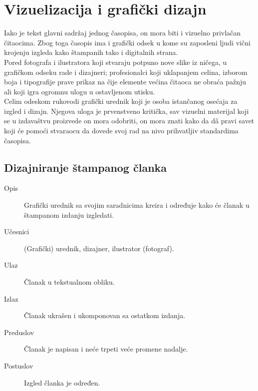 \section{Vizuelizacija i grafički dizajn}
Iako je tekst glavni sadržaj jednog časopisa, on mora biti i vizuelno privlačan čitaocima. Zbog toga časopis ima i grafički odsek u kome su zaposleni ljudi vični krojenju izgleda kako štampanih tako i digitalnih strana. \\

Pored fotografa i ilustratora koji stvaraju potpuno nove slike iz ničega, u grafičkom odseku rade i dizajneri; profesionalci koji uklapanjem celina, izborom boja i tipografije prave prikaz na čije elemente većina čitaoca ne obraća pažnju ali koji igra ogromnu ulogu u ostavljenom utisku. \\

Celim odeskom rukovodi grafički urednik koji je osoba istančanog osećaja za izgled i dizajn. Njegova uloga je prvenstveno kritička, sav vizuelni materijal koji se u izdavaštvu proizvede on mora odobriti, on mora znati kako da d\^{a} pravi savet koji će pomoći stvaraocu da dovede svoj rad na nivo prihvatljiv standardima časopisa.


\subsection{Dizajniranje štampanog članka}
\begin{description}
\item [Opis] Grafički urednik sa svojim saradnicima kreira i određuje kako će članak u štampanom izdanju izgledati.
\item [Učesnici] (Grafički) urednik, dizajner, ilustrator (fotograf).
\item [Ulaz] Članak u tekstualnom obliku.
\item [Izlaz] Članak ukrašen i ukomponovan sa ostatkom izdanja.
\item [Preduslov] Članak je napisan i neće trpeti veće promene nadalje.
\item [Postuslov] Izgled članka je određen.
\end{description}
